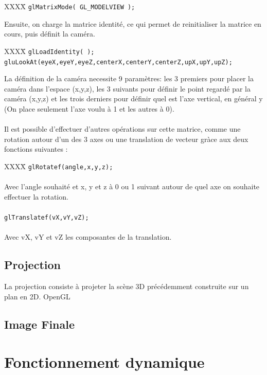 \begin{tabbing}
XXXX\= \kill
\> \verb|glMatrixMode( GL_MODELVIEW );|
\end{tabbing}

Ensuite, on charge la matrice identité, ce qui permet de reinitialiser la matrice en cours, puis définit la caméra.

\begin{tabbing}
XXXX\= \kill
\> \verb|glLoadIdentity( );| \\
\> \verb|gluLookAt(eyeX,eyeY,eyeZ,centerX,centerY,centerZ,upX,upY,upZ);|
\end{tabbing}

La définition de la caméra necessite 9 paramètres: les 3 premiers pour placer la caméra dans l'espace (x,y,z), les 3 suivants pour définir le point regardé par la caméra (x,y,z) et les trois derniers pour définir quel est l'axe vertical, en général y (On place seulement l'axe voulu à 1 et les autres à 0).\\\\

Il est possible d'effectuer d'autres opérations sur cette matrice, comme une rotation autour d'un des 3 axes ou une translation de vecteur gràce aux deux fonctions suivantes :

\begin{tabbing}
XXXX\= \kill
\> \verb|glRotatef(angle,x,y,z);| \\\\
Avec l'angle souhaité et x, y et z à 0 ou 1 suivant autour de quel axe on souhaite\\ effectuer la rotation.\\\\
\> \verb|glTranslatef(vX,vY,vZ);|\\\\
Avec vX, vY et vZ les composantes de la translation. 
\end{tabbing}

\subsection{Projection}

La projection consiste à projeter la scène 3D précédemment construite sur un plan en 2D. OpenGL 

\subsection{Image Finale}


\newpage
\section{Fonctionnement dynamique}

